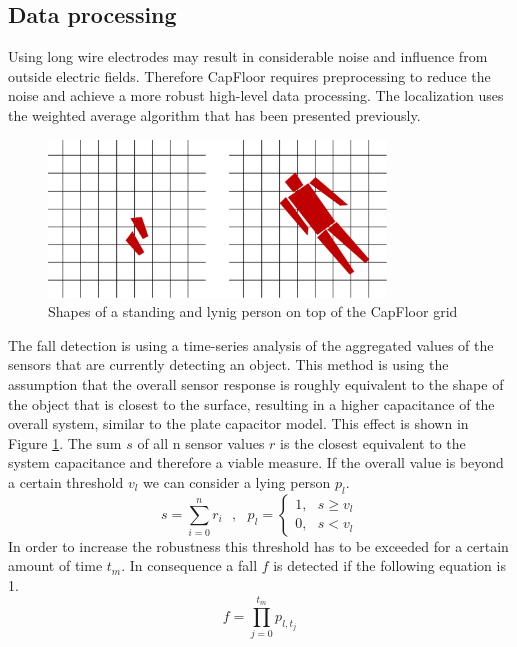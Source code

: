 \subsection{Data processing}
Using long wire electrodes may result in considerable noise and influence from outside electric fields. Therefore CapFloor requires preprocessing to reduce the noise and achieve a more robust high-level data processing. The localization uses the weighted average algorithm that has been presented previously. 
\begin{figure}[h]
\centering
\includegraphics[width=0.8\textwidth]{images/floor_shapes}
\caption{Shapes of a standing and lynig person on top of the CapFloor grid}
\label{fig:capfloor_shapes}
\end{figure}
The fall detection is using a time-series analysis of the aggregated values of the sensors that are currently detecting an object. This method is using the assumption that the overall sensor response is roughly equivalent to the shape of the object that is closest to the surface, resulting in a higher capacitance of the overall system, similar to the plate capacitor model. This effect is shown in Figure \ref{fig:capfloor_shapes}. The sum $s$ of all n sensor values $r$ is the closest equivalent to the system capacitance and therefore a viable measure. If the overall value is beyond a certain threshold $v_l$ we can consider a lying person $p_l$.
\[s=\sum^n_{i=0}{r_i}\ \ \ ,\ \ \ p_l=\left\{ \begin{array}{c}
1,\ \ \ s\ge v_l \\ 
0,\ \ \ s<v_l \end{array}
\right.\] 
In order to increase the robustness this threshold has to be exceeded for a certain amount of time $t_m$. In consequence a fall $f$ is detected if the following equation is 1.
\[f=\prod^{t_m}_{j=0}{p_{l,t_j}}\]
